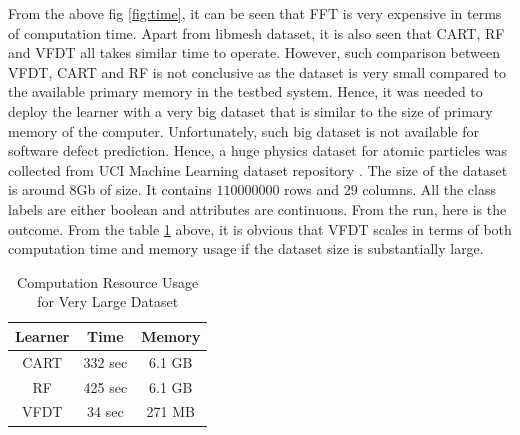 \documentclass[sigplan]{acmart}\settopmatter{printfolios=true,printccs=false,printacmref=false}
\begin{document}
From the above fig \ref{fig:time}, it can be seen that FFT is very expensive in terms of computation time. Apart from libmesh dataset, it is also seen that CART, RF and VFDT all takes similar time to operate. However, such comparison between VFDT, CART and RF is not conclusive as the dataset is very small compared to the available primary memory in the testbed system. Hence, it was needed to deploy the learner with a very big dataset that is similar to the size of primary memory of the computer. Unfortunately, such big dataset is not available for software defect prediction. Hence, a huge physics dataset for atomic particles was collected from UCI Machine Learning dataset repository \cite{uciml}. The size of the dataset is around $8$Gb of size. It contains $110000000$ rows and $29$ columns. All the class labels are either boolean and attributes are continuous. From the run, here is the outcome. From the table \ref{higgs} above, it is obvious that VFDT scales in terms of both computation time and memory usage if the dataset size is substantially large.

\begin{table}
	\begin{tabular}{|c|c|c|}
		\hline 
		\textbf{Learner} & \textbf{Time} & \textbf{Memory} \\ 
		\hline 
		CART & 332 sec & 6.1 GB \\ 
		\hline 
		RF & 425 sec & 6.1 GB \\ 
		\hline 
		VFDT & 34 sec & 271 MB \\ 
		\hline 
	\end{tabular}
	\caption{Computation Resource Usage for Very Large Dataset} 
	\label{higgs}
\end{table}
\end{document}
